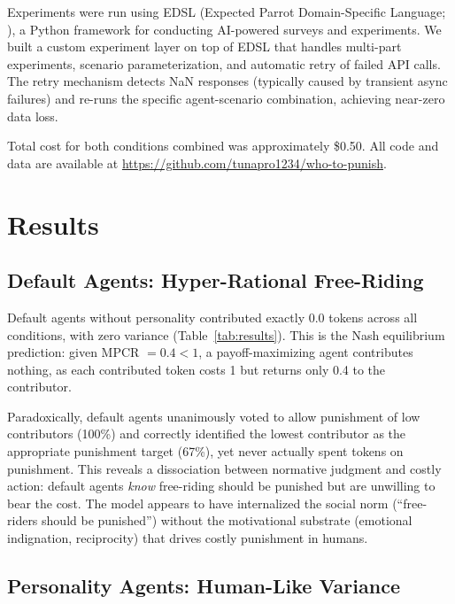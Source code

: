 \documentclass[12pt, a4paper]{article}
\begin{document}
Experiments were run using EDSL (Expected Parrot Domain-Specific Language; \citealt{edsl}), a Python framework for conducting AI-powered surveys and experiments. We built a custom experiment layer on top of EDSL that handles multi-part experiments, scenario parameterization, and automatic retry of failed API calls. The retry mechanism detects NaN responses (typically caused by transient async failures) and re-runs the specific agent-scenario combination, achieving near-zero data loss.

Total cost for both conditions combined was approximately \$0.50. All code and data are available at \url{https://github.com/tunapro1234/who-to-punish}.

\section{Results}

\subsection{Default Agents: Hyper-Rational Free-Riding}

Default agents without personality contributed exactly 0.0 tokens across all conditions, with zero variance (Table~\ref{tab:results}). This is the Nash equilibrium prediction: given MPCR $= 0.4 < 1$, a payoff-maximizing agent contributes nothing, as each contributed token costs 1 but returns only 0.4 to the contributor.

Paradoxically, default agents unanimously voted to allow punishment of low contributors (100\%) and correctly identified the lowest contributor as the appropriate punishment target (67\%), yet never actually spent tokens on punishment. This reveals a dissociation between normative judgment and costly action: default agents \emph{know} free-riding should be punished but are unwilling to bear the cost. The model appears to have internalized the social norm (``free-riders should be punished'') without the motivational substrate (emotional indignation, reciprocity) that drives costly punishment in humans.

\subsection{Personality Agents: Human-Like Variance}
\end{document}
